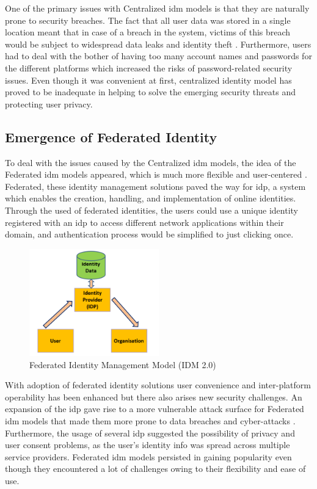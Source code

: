 One of the primary issues with Centralized \gls{idm} models is that they are naturally prone to security breaches. The fact that all user data was stored in a single 
location meant that in case of a breach in the system, victims of this breach would be subject to widespread data leaks and identity theft \cite{businessreporter}. 
Furthermore, users had to deal with the bother of having too many account names and passwords for the different platforms which increased the risks of password-related 
security issues. Even though it was convenient at first, centralized identity model has proved to be inadequate in helping to solve the emerging security threats and 
protecting user privacy.

\subsection{Emergence of Federated Identity}

To deal with the issues caused by the Centralized \gls{idm} models, the idea of the Federated \gls{idm} models appeared, which is much more flexible and user-centered 
\cite{9695553}. Federated, these identity management solutions paved the way for \gls{idp}, a system which enables the creation, handling, and implementation of online 
identities. Through the used of federated identities, the users could use a unique identity registered with an \gls{idp} to access different network applications within their
domain, and authentication process would be simplified to just clicking once.

\begin{figure}[h]  
  \centering
  \includegraphics[width=0.5\textwidth]{Images/c3_3.png} 
  \caption{Federated Identity Management Model (IDM 2.0)}
\end{figure}

With adoption of federated identity solutions user convenience and inter-platform operability has been enhanced but there also arises new security challenges. An expansion
of the \gls{idp} gave rise to a more vulnerable attack surface for Federated \gls{idm} models that made them more prone to data breaches and cyber-attacks \cite{9695553}. 
Furthermore, the usage of several \gls{idp} suggested the possibility of privacy and user consent problems, as the user’s identity info was spread across multiple 
service providers. Federated \gls{idm} models persisted in gaining popularity even though they encountered a lot of challenges owing to their flexibility and ease of use.

